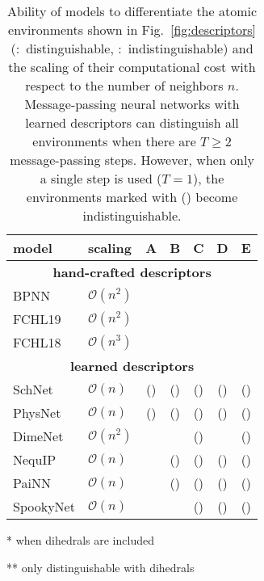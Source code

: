 \documentclass[%
superscriptaddress,
reprint,
nofootinbib,
amsmath,amssymb,amsfonts,
floatfix,
altaffilletter,
showkeys,
]{revtex4-2}
\newcommand{\cmark}{\ding{51}}
\newcommand{\xmark}{\ding{55}}
\newcommand{\nn}{SpookyNet}
\begin{document}
\begin{table}
	\begin{threeparttable}
		\begin{tabular} {l l c c c c c }
			\toprule
			\bf model & \bf scaling & \bf A & \bf B & \bf C & \bf D & \bf E \\
			\midrule
			\multicolumn{7}{c}{\bf hand-crafted descriptors}\\
			BPNN\cite{behler2007generalized} & $\mathcal{O}(n^2)$ & \cmark & \cmark & \xmark & \cmark & \xmark \\
			FCHL19\cite{christensen2020fchl} & $\mathcal{O}(n^2)$ & \cmark & \cmark & \xmark & \cmark & \xmark \\
			FCHL18\cite{faber2018alchemical} & $\mathcal{O}(n^3)$\tnote{*} & \cmark & \cmark & \cmark\tnote{**} & \cmark & \xmark \\
			\midrule
			\multicolumn{7}{c}{\bf learned descriptors}\\
			SchNet\cite{schutt2018schnet} & $\mathcal{O}(n)$ &(\cmark) & (\cmark) & (\cmark) & (\cmark) & (\cmark) \\
			PhysNet\cite{unke2019physnet} & $\mathcal{O}(n)$ & (\cmark) & (\cmark) & (\cmark) & (\cmark) & (\cmark) \\
			DimeNet\cite{klicpera2020directional} & $\mathcal{O}(n^2)$ & \cmark & \cmark & (\cmark) & \cmark & (\cmark) \\
			NequIP\cite{batzner2021se} & $\mathcal{O}(n)$ &\cmark & (\cmark) & (\cmark) & (\cmark) & (\cmark) \\
			PaiNN\cite{schutt2021equivariant} & $\mathcal{O}(n)$ & \cmark & (\cmark) & (\cmark) & (\cmark) & (\cmark) \\
			\nn{} & $\mathcal{O}(n)$ & \cmark & \cmark & (\cmark) & (\cmark) & (\cmark) \\
			\bottomrule
		\end{tabular}
		\begin{tablenotes}\footnotesize
			\item[*] when dihedrals are included
			\item[**] only distinguishable with dihedrals
		\end{tablenotes}
	\end{threeparttable}
	\caption{Ability of models to differentiate the atomic environments shown in Fig.~\ref{fig:descriptors} (\cmark:~distinguishable, \xmark:~indistinguishable) and the scaling of their computational cost  with respect to the number of neighbors $n$. Message-passing neural networks with learned descriptors can distinguish all environments when there are $T\geq2$ message-passing steps. However, when only a single step is used ($T=1$), the environments marked with (\cmark) become indistinguishable.}
	\label{tab:descriptors}
\end{table}
\end{document}
